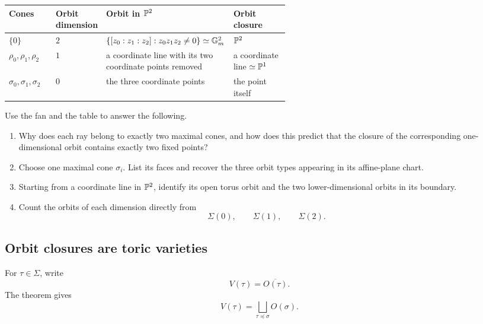\begin{center}
\small
\renewcommand{\arraystretch}{1.25}
\begin{tabularx}{\linewidth}{@{}
  >{\raggedright\arraybackslash}p{0.19\linewidth}
  >{\raggedright\arraybackslash}p{0.13\linewidth}
  >{\raggedright\arraybackslash}X
  >{\raggedright\arraybackslash}p{0.23\linewidth}@{}}
\toprule
\textbf{Cones}
&
\textbf{Orbit dimension}
&
\textbf{Orbit in \(\mathbb{P}^2\)}
&
\textbf{Orbit closure}
\\
\midrule
\(\{0\}\)
&
\(2\)
&
\(\{[z_0:z_1:z_2]:z_0z_1z_2\neq0\}\simeq\mathbb{G}_{m}^2\)
&
\(\mathbb{P}^2\)
\\
\(\rho_0,\rho_1,\rho_2\)
&
\(1\)
&
a coordinate line with its two coordinate points removed
&
a coordinate line \(\simeq\mathbb{P}^1\)
\\
\(\sigma_0,\sigma_1,\sigma_2\)
&
\(0\)
&
the three coordinate points
&
the point itself
\\
\bottomrule
\end{tabularx}
\end{center}

\begin{surfacelaboratory}
Use the fan and the table to answer the following.

\begin{enumerate}[label=(\alph*),wide=0pt]
\item Why does each ray belong to exactly two maximal cones, and how
does this predict that the closure of the corresponding
one-dimensional orbit contains exactly two fixed points?

\item Choose one maximal cone \(\sigma_i\). List its faces and recover
the three orbit types appearing in its affine-plane chart.

\item Starting from a coordinate line in \(\mathbb{P}^2\), identify its open
torus orbit and the two lower-dimensional orbits in its boundary.

\item Count the orbits of each dimension directly from
\[
\Sigma(0),\qquad\Sigma(1),\qquad\Sigma(2).
\]
\end{enumerate}
\end{surfacelaboratory}

\subsection{Orbit closures are toric varieties}

For \(\tau\in\Sigma\), write
\[
V(\tau)=\overline{O(\tau)}.
\]
The theorem gives
\[
V(\tau)
=
\bigsqcup_{\tau\preceq\sigma}O(\sigma).
\]

